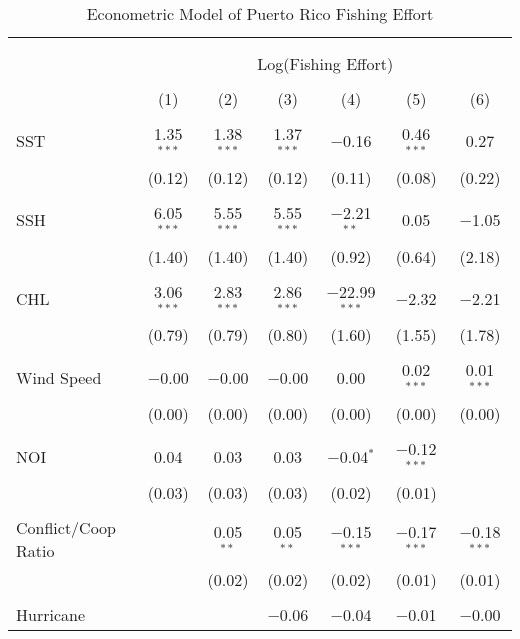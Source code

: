 \documentclass[10pt]{article}
\begin{document}
\begin{table}[!htbp] \centering 
  \caption{Econometric Model of Puerto Rico Fishing Effort} 
  \label{} 
\footnotesize 
\begin{tabular}{@{\extracolsep{5pt}}lcccccc} 
\\[-1.8ex]\hline 
\hline \\[-1.8ex] 
\\[-1.8ex] & \multicolumn{6}{c}{Log(Fishing Effort)} \\ 
\\[-1.8ex] & (1) & (2) & (3) & (4) & (5) & (6)\\ 
\hline \\[-1.8ex] 
 SST & 1.35$^{***}$ & 1.38$^{***}$ & 1.37$^{***}$ & $-$0.16 & 0.46$^{***}$ & 0.27 \\ 
  & (0.12) & (0.12) & (0.12) & (0.11) & (0.08) & (0.22) \\ 
  & & & & & & \\ 
 SSH & 6.05$^{***}$ & 5.55$^{***}$ & 5.55$^{***}$ & $-$2.21$^{**}$ & 0.05 & $-$1.05 \\ 
  & (1.40) & (1.40) & (1.40) & (0.92) & (0.64) & (2.18) \\ 
  & & & & & & \\ 
 CHL & 3.06$^{***}$ & 2.83$^{***}$ & 2.86$^{***}$ & $-$22.99$^{***}$ & $-$2.32 & $-$2.21 \\ 
  & (0.79) & (0.79) & (0.80) & (1.60) & (1.55) & (1.78) \\ 
  & & & & & & \\ 
 Wind Speed & $-$0.00 & $-$0.00 & $-$0.00 & 0.00 & 0.02$^{***}$ & 0.01$^{***}$ \\ 
  & (0.00) & (0.00) & (0.00) & (0.00) & (0.00) & (0.00) \\ 
  & & & & & & \\ 
 NOI & 0.04 & 0.03 & 0.03 & $-$0.04$^{*}$ & $-$0.12$^{***}$ &  \\ 
  & (0.03) & (0.03) & (0.03) & (0.02) & (0.01) &  \\ 
  & & & & & & \\ 
 Conflict/Coop Ratio &  & 0.05$^{**}$ & 0.05$^{**}$ & $-$0.15$^{***}$ & $-$0.17$^{***}$ & $-$0.18$^{***}$ \\ 
  &  & (0.02) & (0.02) & (0.02) & (0.01) & (0.01) \\ 
  & & & & & & \\ 
 Hurricane &  &  & $-$0.06 & $-$0.04 & $-$0.01 & $-$0.00 \\ 

\end{tabular}
\end{table}
\end{document}
